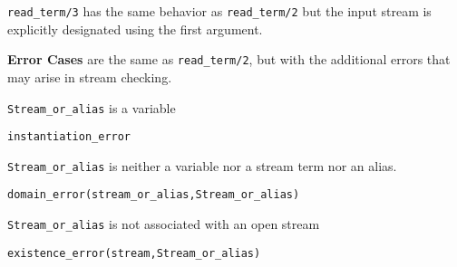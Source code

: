 \begin{description}

%
{\tt read\_term/3} has the same behavior as {\tt read\_term/2} but
the input stream is explicitly designated using the first argument.

{\bf Error Cases} are the same as {\tt read\_term/2}, but with the
additional errors that may arise in stream checking.
\bi
\item 	{\tt Stream\_or\_alias} is a variable
\bi
\item {\tt instantiation\_error}
\ei
\item 	{\tt Stream\_or\_alias} is neither a variable nor a stream term nor an alias.
\bi
\item 	{\tt domain\_error(stream\_or\_alias,Stream\_or\_alias)}
\ei
\item 	{\tt Stream\_or\_alias} is not associated with an open stream
\bi
\item 	{\tt existence\_error(stream,Stream\_or\_alias)}
\ei
\ei


\end{description}
